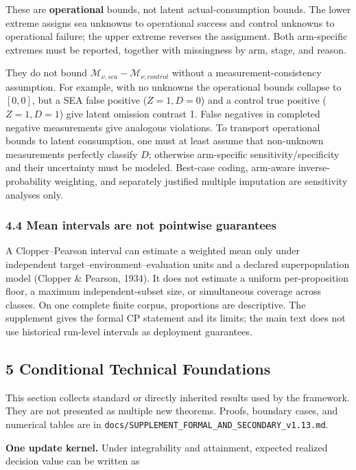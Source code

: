 \documentclass[
  11pt]{article}
\begin{document}
These are \textbf{operational} bounds, not latent actual-consumption
bounds. The lower extreme assigns sea unknowns to operational success
and control unknowns to operational failure; the upper extreme reverses
the assignment. Both arm-specific extremes must be reported, together
with missingness by arm, stage, and reason.

They do not bound \(\mathcal M_{\nu,sea}-\mathcal M_{\nu,control}\)
without a measurement-consistency assumption. For example, with no
unknowns the operational bounds collapse to \([0,0]\), but a SEA false
positive (\(Z=1,D=0\)) and a control true positive (\(Z=1,D=1\)) give
latent omission contrast 1. False negatives in completed negative
measurements give analogous violations. To transport operational bounds
to latent consumption, one must at least assume that non-unknown
measurements perfectly classify \(D\); otherwise arm-specific
sensitivity/specificity and their uncertainty must be modeled. Best-case
coding, arm-aware inverse-probability weighting, and separately
justified multiple imputation are sensitivity analyses only.

\subsubsection{4.4 Mean intervals are not pointwise
guarantees}\label{mean-intervals-are-not-pointwise-guarantees}

A Clopper--Pearson interval can estimate a weighted mean only under
independent target--environment--evaluation units and a declared
superpopulation model (Clopper \& Pearson, 1934). It does not estimate a
uniform per-proposition floor, a maximum independent-subset size, or
simultaneous coverage across classes. On one complete finite corpus,
proportions are descriptive. The supplement gives the formal CP
statement and its limits; the main text does not use historical
run-level intervals as deployment guarantees.

\subsection{5 Conditional Technical
Foundations}\label{conditional-technical-foundations}

This section collects standard or directly inherited results used by the
framework. They are not presented as multiple new theorems. Proofs,
boundary cases, and numerical tables are in
\texttt{docs/SUPPLEMENT\_FORMAL\_AND\_SECONDARY\_v1.13.md}.

\textbf{One update kernel.} Under integrability and attainment, expected
realized decision value can be written as
\end{document}
